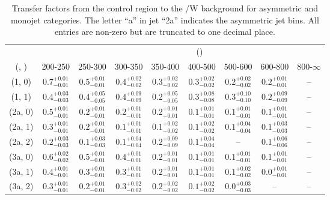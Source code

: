 \begin{table}[h!]
\tiny
\centering
\caption{Transfer factors from the \mj control region to the \ttbar/W background for asymmetric and monojet categories. The letter ``a'' in jet \eg ``2a''  indicates the asymmetric jet bins. All entries are non-zero but are truncated to one decimal place.\label{tab:tf_ttw_mu_asym}}
\begin{tabular}
{ccccccccc}
	\hline\hline
&	& \multicolumn{8}{c}{\scalht (\gev)} \\ 
	 (\njet,  \nb) & 200-250 & 250-300 & 300-350 & 350-400 & 400-500 & 500-600 & 600-800 & 800-$\infty$ \\ [0.8ex] 
\hline
	(1, 0) & $0.7^{+ 0.01 }_{- 0.01 }$ & $0.5^{+ 0.01 }_{- 0.01 }$ & $0.4^{+ 0.02 }_{- 0.02 }$ & $0.3^{+ 0.02 }_{- 0.02 }$ & $0.3^{+ 0.02 }_{- 0.02 }$ & $0.2^{+ 0.02 }_{- 0.02 }$ & $0.2^{+ 0.01 }_{- 0.01 }$ & -- \\[0.5ex] 
	(1, 1) & $0.4^{+ 0.03 }_{- 0.03 }$ & $0.4^{+ 0.05 }_{- 0.05 }$ & $0.4^{+ 0.09 }_{- 0.09 }$ & $0.2^{+ 0.05 }_{- 0.05 }$ & $0.3^{+ 0.08 }_{- 0.08 }$ & $0.3^{+ 0.10 }_{- 0.10 }$ & $0.2^{+ 0.09 }_{- 0.09 }$ & -- \\[0.5ex] 
	(2a, 0) & $0.5^{+ 0.01 }_{- 0.01 }$ & $0.2^{+ 0.01 }_{- 0.01 }$ & $0.2^{+ 0.01 }_{- 0.01 }$ & $0.2^{+ 0.01 }_{- 0.01 }$ & $0.1^{+ 0.01 }_{- 0.01 }$ & $0.1^{+ 0.01 }_{- 0.01 }$ & $0.1^{+ 0.01 }_{- 0.01 }$ & -- \\[0.5ex] 
	(2a, 1) & $0.3^{+ 0.01 }_{- 0.01 }$ & $0.2^{+ 0.01 }_{- 0.01 }$ & $0.1^{+ 0.01 }_{- 0.01 }$ & $0.1^{+ 0.02 }_{- 0.02 }$ & $0.1^{+ 0.02 }_{- 0.02 }$ & $0.1^{+ 0.04 }_{- 0.04 }$ & $0.1^{+ 0.03 }_{- 0.03 }$ & -- \\[0.5ex] 
	(2a, 2) & $0.2^{+ 0.03 }_{- 0.03 }$ & $0.1^{+ 0.03 }_{- 0.03 }$ & $0.1^{+ 0.04 }_{- 0.04 }$ & $0.2^{+ 0.09 }_{- 0.09 }$ & $0.1^{+ 0.04 }_{- 0.04 }$ & -- & $0.1^{+ 0.06 }_{- 0.06 }$ & -- \\[0.5ex] 
	(3a, 0) & $0.6^{+ 0.02 }_{- 0.02 }$ & $0.5^{+ 0.01 }_{- 0.01 }$ & $0.4^{+ 0.01 }_{- 0.01 }$ & $0.2^{+ 0.01 }_{- 0.01 }$ & $0.1^{+ 0.01 }_{- 0.01 }$ & $0.1^{+ 0.01 }_{- 0.01 }$ & $0.1^{+ 0.01 }_{- 0.01 }$ & -- \\[0.5ex] 
	(3a, 1) & $0.4^{+ 0.01 }_{- 0.01 }$ & $0.3^{+ 0.01 }_{- 0.01 }$ & $0.3^{+ 0.01 }_{- 0.01 }$ & $0.2^{+ 0.01 }_{- 0.01 }$ & $0.1^{+ 0.01 }_{- 0.01 }$ & $0.1^{+ 0.02 }_{- 0.02 }$ & $0.0^{+ 0.01 }_{- 0.01 }$ & -- \\[0.5ex] 
	(3a, 2) & $0.3^{+ 0.01 }_{- 0.01 }$ & $0.2^{+ 0.01 }_{- 0.01 }$ & $0.3^{+ 0.02 }_{- 0.02 }$ & $0.2^{+ 0.02 }_{- 0.02 }$ & $0.1^{+ 0.02 }_{- 0.02 }$ & $0.0^{+ 0.03 }_{- 0.03 }$ & -- & -- \\[0.5ex] 

\end{tabular}
\end{table}
